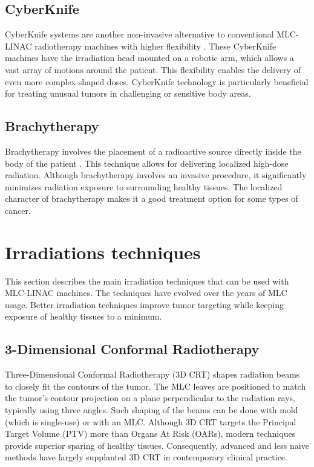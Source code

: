 \subsection{CyberKnife}
CyberKnife systems are another non-invasive alternative to conventional MLC-LINAC radiotherapy machines with higher flexibility \cite{Kilby2020}.
These CyberKnife machines have the irradiation head mounted on a robotic arm, which allows a vast array of motions around the patient.
This flexibility enables the delivery of even more complex-shaped doses.
CyberKnife technology is particularly beneficial for treating unusual tumors in challenging or sensitive body areas.

\subsection{Brachytherapy}
Brachytherapy involves the placement of a radioactive source directly inside the body of the patient \cite{Chargari2019}.
This technique allows for delivering localized high-dose radiation.
Although brachytherapy involves an invasive procedure, it significantly minimizes radiation exposure to surrounding healthy tissues.
The localized character of brachytherapy makes it a good treatment option for some types of cancer.






\section{Irradiations techniques}
This section describes the main irradiation techniques that can be used with MLC-LINAC machines.
The techniques have evolved over the years of MLC usage.
Better irradiation techniques improve tumor targeting while keeping exposure of healthy tissues to a minimum.

\subsection[3D-CRT]{3-Dimensional Conformal Radiotherapy}
Three-Dimensional Conformal Radiotherapy (3D CRT) shapes radiation beams to closely fit the contours of the tumor.
The MLC leaves are positioned to match the tumor's contour projection on a plane perpendicular to the radiation rays, typically using three angles.
Such shaping of the beams can be done with mold (which is single-use) or with an MLC.
Although 3D CRT targets the Principal Target Volume (PTV) more than Organs At Risk (OARs), modern techniques provide superior sparing of healthy tissues.
Consequently, advanced and less naive methods have largely supplanted 3D CRT in contemporary clinical practice.

